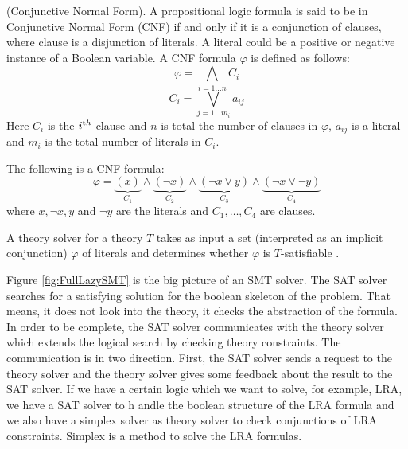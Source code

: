 \begin{definition}
\label{def:CNF}
    (Conjunctive Normal Form).
    A propositional logic formula is said to be in Conjunctive Normal Form (CNF) if and only if it is a conjunction of clauses, where clause is a disjunction of literals. A literal could be a positive or negative instance of a Boolean variable. A CNF formula $\varphi$ is defined as follows:
$$\varphi = \bigwedge\limits_{i=1\ldots n} C_{i}$$
$$ C_{i} = \bigvee\limits_{j=1\ldots m_{i}} a_{ij}$$
Here $C_{i}$ is the $i^{\text th}$ clause and $n$ is total the number of clauses in $\varphi$, $a_{ij}$ is a literal and $m_{i}$ is the total number of literals in $C_{i}$.\newline
\begin{example}
	The following is a CNF formula:
	$$\varphi=\underbrace{(x)}\limits_{C_{1}}\wedge\underbrace{(\neg x)}\limits_{C_2}\wedge\underbrace{(\neg x\vee y)}\limits_{C_{3}}\wedge\underbrace{(\neg x \vee \neg y)}\limits_{C_{4}}$$
	where $x, \neg x, y$ and $\neg y$ are the literals and $C_{1}, \ldots, C_{4}$ are clauses.
\end{example}
\end{definition}

\noindent A theory solver for a theory $T$ takes as input a set (interpreted as an implicit conjunction) $\varphi$ of literals and determines whether $\varphi$ is $T$-satisfiable \cite{TSNYU}.\newline

\noindent Figure \ref{fig:FullLazySMT} is the big picture of an SMT solver.
The SAT solver searches for a satisfying solution for the boolean skeleton of the problem.
That means, it does not look into the theory, it checks the abstraction of the formula.
In order to be complete, the SAT solver communicates with the theory solver which extends the logical search by checking theory constraints.
The communication is in two direction.
First, the SAT solver sends a request to the theory solver and the theory solver gives some feedback about the result to the SAT solver.
If we have a certain logic which we want to solve, for example, LRA, we have a SAT solver to h andle the boolean structure of the LRA formula and we also have a simplex solver as theory solver to check conjunctions of LRA constraints.
Simplex is a method to solve the LRA formulas.

